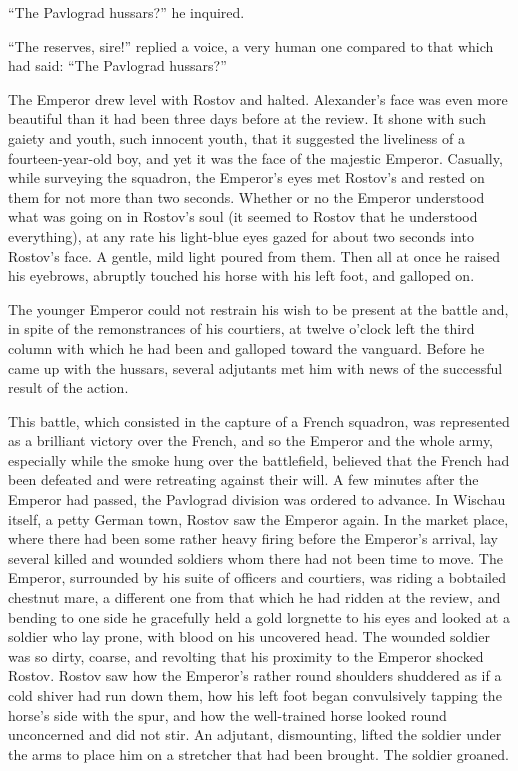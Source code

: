 ``The Pavlograd hussars?'' he inquired.

``The reserves, sire!'' replied a voice, a very human one
compared to that which had said: ``The Pavlograd hussars?''

The Emperor drew level with Rostov and halted. Alexander's face
was even more beautiful than it had been three days before at the
review. It shone with such gaiety and youth, such innocent youth,
that it suggested the liveliness of a fourteen-year-old boy, and
yet it was the face of the majestic Emperor. Casually, while
surveying the squadron, the Emperor's eyes met Rostov's and
rested on them for not more than two seconds. Whether or no the
Emperor understood what was going on in Rostov's soul (it seemed
to Rostov that he understood everything), at any rate his
light-blue eyes gazed for about two seconds into Rostov's face. A
gentle, mild light poured from them. Then all at once he raised
his eyebrows, abruptly touched his horse with his left foot, and
galloped on.

The younger Emperor could not restrain his wish to be present at
the battle and, in spite of the remonstrances of his courtiers,
at twelve o'clock left the third column with which he had been
and galloped toward the vanguard. Before he came up with the
hussars, several adjutants met him with news of the successful
result of the action.

This battle, which consisted in the capture of a French squadron,
was represented as a brilliant victory over the French, and so
the Emperor and the whole army, especially while the smoke hung
over the battlefield, believed that the French had been defeated
and were retreating against their will. A few minutes after the
Emperor had passed, the Pavlograd division was ordered to
advance. In Wischau itself, a petty German town, Rostov saw the
Emperor again. In the market place, where there had been some
rather heavy firing before the Emperor's arrival, lay several
killed and wounded soldiers whom there had not been time to
move. The Emperor, surrounded by his suite of officers and
courtiers, was riding a bobtailed chestnut mare, a different one
from that which he had ridden at the review, and bending to one
side he gracefully held a gold lorgnette to his eyes and looked
at a soldier who lay prone, with blood on his uncovered head. The
wounded soldier was so dirty, coarse, and revolting that his
proximity to the Emperor shocked Rostov. Rostov saw how the
Emperor's rather round shoulders shuddered as if a cold shiver
had run down them, how his left foot began convulsively tapping
the horse's side with the spur, and how the well-trained horse
looked round unconcerned and did not stir. An adjutant,
dismounting, lifted the soldier under the arms to place him on a
stretcher that had been brought. The soldier groaned.

